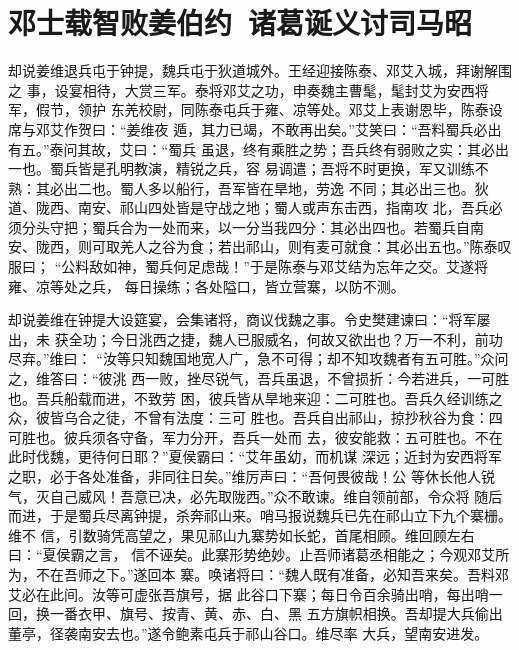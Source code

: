 \chapter{邓士载智败姜伯约~诸葛诞义讨司马昭}

却说姜维退兵屯于钟提，魏兵屯于狄道城外。王经迎接陈泰、邓艾入城，拜谢解围之
事，设宴相待，大赏三军。泰将邓艾之功，申奏魏主曹髦，髦封艾为安西将军，假节，领护
东羌校尉，同陈泰屯兵于雍、凉等处。邓艾上表谢恩毕，陈泰设席与邓艾作贺曰：“姜维夜
遁，其力已竭，不敢再出矣。”艾笑曰：“吾料蜀兵必出有五。”泰问其故，艾曰：“蜀兵
虽退，终有乘胜之势；吾兵终有弱败之实：其必出一也。蜀兵皆是孔明教演，精锐之兵，容
易调遣；吾将不时更换，军又训练不熟：其必出二也。蜀人多以船行，吾军皆在旱地，劳逸
不同；其必出三也。狄道、陇西、南安、祁山四处皆是守战之地；蜀人或声东击西，指南攻
北，吾兵必须分头守把；蜀兵合为一处而来，以一分当我四分：其必出四也。若蜀兵自南
安、陇西，则可取羌人之谷为食；若出祁山，则有麦可就食：其必出五也。”陈泰叹服曰；
“公料敌如神，蜀兵何足虑哉！”于是陈泰与邓艾结为忘年之交。艾遂将雍、凉等处之兵，
每日操练；各处隘口，皆立营寨，以防不测。

却说姜维在钟提大设筵宴，会集诸将，商议伐魏之事。令史樊建谏曰：“将军屡出，未
获全功；今日洮西之捷，魏人已服威名，何故又欲出也？万一不利，前功尽弃。”维曰：
“汝等只知魏国地宽人广，急不可得；却不知攻魏者有五可胜。”众问之，维答曰：“彼洮
西一败，挫尽锐气，吾兵虽退，不曾损折：今若进兵，一可胜也。吾兵船载而进，不致劳
困，彼兵皆从旱地来迎：二可胜也。吾兵久经训练之众，彼皆乌合之徒，不曾有法度：三可
胜也。吾兵自出祁山，掠抄秋谷为食：四可胜也。彼兵须各守备，军力分开，吾兵一处而
去，彼安能救：五可胜也。不在此时伐魏，更待何日耶？”夏侯霸曰：“艾年虽幼，而机谋
深远；近封为安西将军之职，必于各处准备，非同往日矣。”维厉声曰：“吾何畏彼哉！公
等休长他人锐气，灭自己威风！吾意已决，必先取陇西。”众不敢谏。维自领前部，令众将
随后而进，于是蜀兵尽离钟提，杀奔祁山来。哨马报说魏兵已先在祁山立下九个寨栅。维不
信，引数骑凭高望之，果见祁山九寨势如长蛇，首尾相顾。维回顾左右曰：“夏侯霸之言，
信不诬矣。此寨形势绝妙。止吾师诸葛丞相能之；今观邓艾所为，不在吾师之下。”遂回本
寨。唤诸将曰：“魏人既有准备，必知吾来矣。吾料邓艾必在此间。汝等可虚张吾旗号，据
此谷口下寨；每日令百余骑出哨，每出哨一回，换一番衣甲、旗号、按青、黄、赤、白、黑
五方旗帜相换。吾却提大兵偷出董亭，径袭南安去也。”遂令鲍素屯兵于祁山谷口。维尽率
大兵，望南安进发。

